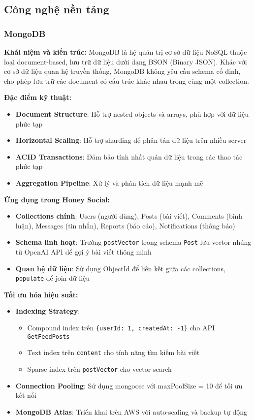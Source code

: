 \subsection{Công nghệ nền tảng}

\subsubsection{MongoDB}
\textbf{Khái niệm và kiến trúc:}
MongoDB là hệ quản trị cơ sở dữ liệu NoSQL thuộc loại document-based, lưu trữ dữ liệu dưới dạng BSON (Binary JSON). Khác với cơ sở dữ liệu quan hệ truyền thống, MongoDB không yêu cầu schema cố định, cho phép lưu trữ các document có cấu trúc khác nhau trong cùng một collection.

\textbf{Đặc điểm kỹ thuật:}
\begin{itemize}
\item \textbf{Document Structure}: Hỗ trợ nested objects và arrays, phù hợp với dữ liệu phức tạp
\item \textbf{Horizontal Scaling}: Hỗ trợ sharding để phân tán dữ liệu trên nhiều server
\item \textbf{ACID Transactions}: Đảm bảo tính nhất quán dữ liệu trong các thao tác phức tạp
\item \textbf{Aggregation Pipeline}: Xử lý và phân tích dữ liệu mạnh mẽ
\end{itemize}

\textbf{Ứng dụng trong Honey Social:}
\begin{itemize}
\item \textbf{Collections chính}: Users (người dùng), Posts (bài viết), Comments (bình luận), Messages (tin nhắn), Reports (báo cáo), Notifications (thông báo)
\item \textbf{Schema linh hoạt}: Trường \texttt{postVector} trong schema \texttt{Post} lưu vector nhúng từ OpenAI API để gợi ý bài viết thông minh
\item \textbf{Quan hệ dữ liệu}: Sử dụng ObjectId để liên kết giữa các collections, \texttt{populate} để join dữ liệu
\end{itemize}

\textbf{Tối ưu hóa hiệu suất:}
\begin{itemize}
\item \textbf{Indexing Strategy}: 
  \begin{itemize}
  \item Compound index trên \texttt{\{userId: 1, createdAt: -1\}} cho API \texttt{GetFeedPosts}
  \item Text index trên \texttt{content} cho tính năng tìm kiếm bài viết
  \item Sparse index trên \texttt{postVector} cho vector search
  \end{itemize}
\item \textbf{Connection Pooling}: Sử dụng mongoose với maxPoolSize = 10 để tối ưu kết nối
\item \textbf{MongoDB Atlas}: Triển khai trên AWS với auto-scaling và backup tự động
\end{itemize}

